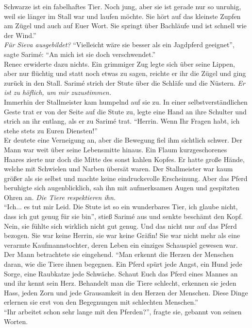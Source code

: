 Schwarze ist ein fabelhaftes Tier. Noch jung, aber sie ist gerade nur so unruhig, weil sie länger 
im Stall war und laufen möchte. Sie hört auf das kleinste Zupfen am Zügel und auch auf Euer Wort. 
Sie springt über Bachläufe und ist schnell wie der Wind.''\\
\textit{Für Sieva ausgebildet?}
``Vielleicht wäre sie besser als ein Jagdpferd geeignet'', sagte Sarimé: ``An mich ist sie doch 
verschwendet.''\\
Renec erwiderte dazu nichts. Ein grimmiger Zug legte sich über seine Lippen, aber nur flüchtig und 
statt noch etwas zu sagen, reichte er ihr die Zügel und ging zurück in den Stall. Sarimé strich der 
Stute über die Schläfe und die Nüstern. \textit{Er ist zu höflich, um mir zuzustimmen.}\\
Immerhin der Stallmeister kam humpelnd auf sie zu. In einer selbstverständlichen Geste trat er von 
der Seite auf die Stute zu, legte eine Hand an ihre Schulter und strich an ihr entlang, als er zu 
Sarimé trat. ``Herrin. Wenn Ihr Fragen habt, ich stehe stets zu Euren Diensten!''\\
Er deutete eine Verneigung an, aber die Bewegung fiel ihm sichtlich schwer. Der Mann war weit über 
seine Lebensmitte hinaus. Ein Flaum kurzgeschorenes Haares zierte nur doch die Mitte des sonst 
kahlen Kopfes. Er hatte große Hände, welche mit Schwielen und Narben übersät waren. Der 
Stallmeister war kaum größer als sie selbst und machte keine eindrucksvolle Erscheinung. Aber das 
Pferd beruhigte sich augenblicklich, sah ihn mit aufmerksamen Augen und gespitzten Ohren an.
\textit{Die Tiere respektieren ihn.}\\
``Ich... es tut mir Leid. Die Stute ist so ein wunderbares Tier, ich glaube nicht, dass ich gut 
genug für sie bin'', stieß Sarimé aus und senkte beschämt den Kopf. Nein, sie fühlte sich wirklich 
nicht gut genug. Und das nicht nur auf das Pferd bezogen. Sie war keine Herrin, sie war keine 
Gräfin! Sie war nicht mehr als eine verarmte Kaufmannstochter, deren Leben ein einziges Schauspiel 
gewesen war. Der Mann betrachtete sie eingehend. ``Man erkennt die Herzen der Menschen daran, wie 
die Tiere ihnen begegnen. Ein Pferd spürt jede Angst, ein Hund jede Sorge, eine Raubkatze jede 
Schwäche. Schaut Euch das Pferd eines Mannes an und ihr kennt sein Herz. Behandelt man die Tiere 
schlecht, erkennen sie jeden Hass, jeden Zorn und jede Grausamkeit in den Herzen der Menschen. Diese 
Dinge erlernen sie erst von den Begegnungen mit schlechten Menschen.''\\
``Ihr arbeitet schon sehr lange mit den Pferden?'', fragte sie, gebannt von seinen Worten.\\
